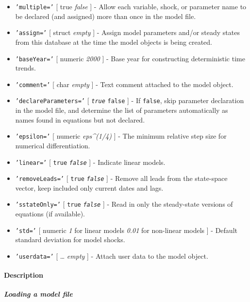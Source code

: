 \begin{itemize}
\item
  \texttt{'multiple='} {[} true \textbar{} \emph{false} {]} - Allow each
  variable, shock, or parameter name to be declared (and assigned) more
  than once in the model file.
\item
  \texttt{'assign='} {[} struct \textbar{} \emph{empty} {]} - Assign
  model parameters and/or steady states from this database at the time
  the model objects is being created.
\item
  \texttt{'baseYear='} {[} numeric \textbar{} \emph{2000} {]} - Base
  year for constructing deterministic time trends.
\item
  \texttt{'comment='} {[} char \textbar{} \emph{empty} {]} - Text
  comment attached to the model object.
\item
  \texttt{'declareParameters='} {[} \emph{\texttt{true}} \textbar{}
  \texttt{false} {]} - If \texttt{false}, skip parameter declaration in
  the model file, and determine the list of parameters automatically as
  names found in equations but not declared.
\item
  \texttt{'epsilon='} {[} numeric \textbar{} \emph{eps\^{}(1/4)} {]} -
  The minimum relative step size for numerical differentiation.
\item
  \texttt{'linear='} {[} \texttt{true} \textbar{} \emph{\texttt{false}}
  {]} - Indicate linear models.
\item
  \texttt{'removeLeads='} {[} \texttt{true} \textbar{}
  \emph{\texttt{false}} {]} - Remove all leads from the state-space
  vector, keep included only current dates and lags.
\item
  \texttt{'sstateOnly='} {[} \texttt{true} \textbar{}
  \emph{\texttt{false}} {]} - Read in only the steady-state versions of
  equations (if available).
\item
  \texttt{'std='} {[} numeric \textbar{} \emph{1} for linear models
  \textbar{} \emph{0.01} for non-linear models {]} - Default standard
  deviation for model shocks.
\item
  \texttt{'userdata='} {[} \ldots{} \textbar{} \emph{empty} {]} - Attach
  user data to the model object.
\end{itemize}

\paragraph{Description}

\subparagraph{Loading a model file}

